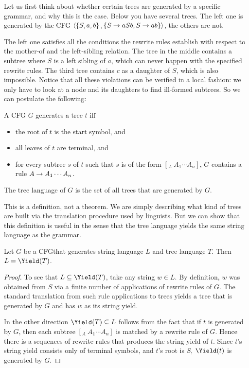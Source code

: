 Let us first think about whether certain trees are generated by a specific grammar, and why this is the case.
Below you have several trees.
The left one is generated by the CFG $\left \langle \left \{ S,a,b \right \}, \left \{ S \rightarrow aSb, S \rightarrow ab \right \} \right \rangle $, the others are not.
%
\begin{center}
    
    \hspace{2em}
    
    \hspace{2em}
    
\end{center}
%
The left one satisfies all the conditions the rewrite rules establish with respect to the mother-of and the left-sibling relation.
The tree in the middle contains a subtree where $S$ is a left sibling of $a$, which can never happen with the specified rewrite rules.
The third tree contains $c$ as a daughter of $S$, which is also impossible.
Notice that all these violations can be verified in a local fashion: we only have to look at a node and its daughters to find ill-formed subtrees.
So we can postulate the following:
%
\begin{definition}
    A CFG $G$ generates a tree $t$ iff
    \begin{itemize}
        \item the root of $t$ is the start symbol, and
        \item all leaves of $t$ are terminal, and
        \item for every subtree $s$ of $t$ such that $s$ is of the form $[_A\ A_1 \cdots A_n]$, $G$ contains a rule $A \rightarrow A_1 \cdots A_n$.
    \end{itemize}
    The tree language of $G$ is the set of all trees that are generated by $G$.
\end{definition}

This is a definition, not a theorem.
We are simply describing what kind of trees are built via the translation procedure used by linguists.
But we can show that this definition is useful in the sense that the tree language yields the same string language as the grammar.
%
\begin{theorem}
    Let $G$ be a CFG\@ that generates string language $L$ and tree language $T$.
    Then $L = \Yield(T)$.
\end{theorem}
%
\begin{proof}
    To see that $L \subseteq \Yield(T)$, take any string $w \in L$.
    By definition, $w$ was obtained from $S$ via a finite number of applications of rewrite rules of $G$.
    The standard translation from such rule applications to trees yields a tree that is generated by $G$ and has $w$ as its string yield.

    In the other direction $\Yield(T) \subseteq L$ follows from the fact that if $t$ is generated by $G$, then each subtree $[_A\ A_1 \cdots A_n]$ is matched by a rewrite rule of $G$.
    Hence there is a sequences of rewrite rules that produces the string yield of $t$. 
    Since $t$'s string yield consists only of terminal symbols, and $t$'s root is $S$, $\Yield(t)$ is generated by $G$.
\end{proof}

